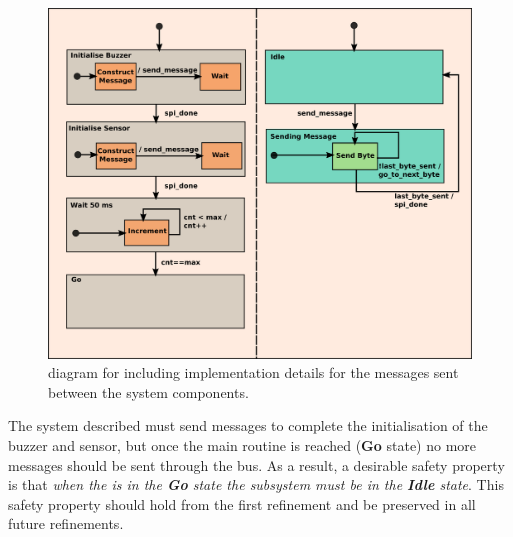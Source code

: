 \begin{figure}[!tbp]
  \begin{centering}
  \includegraphics[width=.99\textwidth]{figures/ASIC&SPI_2}
  \caption{\Statechart diagram for \IDS including implementation details for the messages sent between the system components.}
  \label{fig:ASIC_SPI_2}
  \end{centering}
\end{figure} 

The system described must send messages to complete the initialisation of the buzzer and sensor, but once the main routine is reached (\textbf{Go} state) no more messages should be sent through the \SPI bus. As a result, a desirable safety property is that \emph{when the \ASIC is in the \textbf{Go} state the \SPI subsystem
must be in the \textbf{Idle} state}.
This safety property should hold from the first refinement and be preserved in all future refinements.




